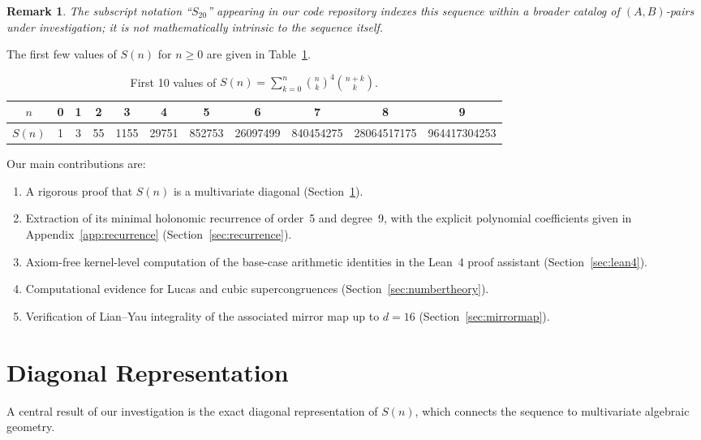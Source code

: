 \documentclass[11pt, a4paper]{article}
\newtheorem{remark}[theorem]{Remark}
\begin{document}
\begin{remark}
The subscript notation ``$S_{20}$'' appearing in our code repository indexes this sequence within a broader catalog of $(A,B)$-pairs under investigation; it is not mathematically intrinsic to the sequence itself.
\end{remark}

The first few values of $S(n)$ for $n \ge 0$ are given in Table~\ref{tab:s20}.
\begin{table}[h]
    \centering
    \begin{tabular}{@{}ccccccccccc@{}}
        \toprule
        $n$ & 0 & 1 & 2 & 3 & 4 & 5 & 6 & 7 & 8 & 9 \\
        \midrule
        $S(n)$ & 1 & 3 & 55 & 1155 & 29751 & 852753 & 26097499 & 840454275 & 28064517175 & 964417304253 \\
        \bottomrule
    \end{tabular}
    \caption{First 10 values of $S(n) = \sum_{k=0}^n \binom{n}{k}^4 \binom{n+k}{k}$.}
    \label{tab:s20}
\end{table}

Our main contributions are:
\begin{enumerate}
    \item A rigorous proof that $S(n)$ is a multivariate diagonal (Section~\ref{sec:diagonal}).
    \item Extraction of its minimal holonomic recurrence of order~5 and degree~9, with the explicit polynomial coefficients given in Appendix~\ref{app:recurrence} (Section~\ref{sec:recurrence}).
    \item Axiom-free kernel-level computation of the base-case arithmetic identities in the Lean~4 proof assistant (Section~\ref{sec:lean4}).
    \item Computational evidence for Lucas and cubic supercongruences (Section~\ref{sec:numbertheory}).
    \item Verification of Lian--Yau integrality of the associated mirror map up to $d=16$ (Section~\ref{sec:mirrormap}).
\end{enumerate}


\section{Diagonal Representation}\label{sec:diagonal}

A central result of our investigation is the exact diagonal representation of $S(n)$, which connects the sequence to multivariate algebraic geometry.
\end{document}
